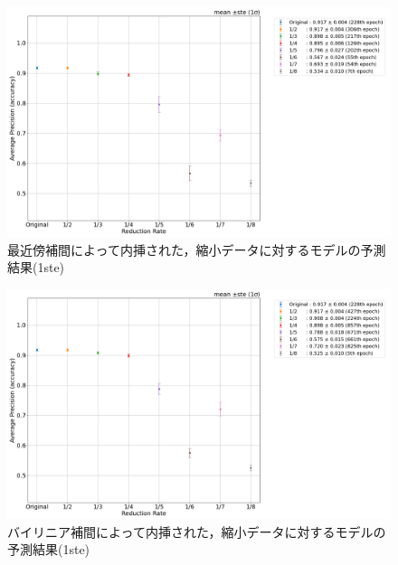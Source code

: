 \documentclass[a4j, 11pt]{jreport}
\begin{document}
\begin{figure}[H]
  \centering
  \includegraphics[width=16cm]{images/5syou/print_errorbar/nearest/acc_with_errorbar_syuron5_nearest_900epoch_30run_300_acc_max_ste1sigma.png}
  \caption{最近傍補間によって内挿された，縮小データに対するモデルの予測結果(1ste)}
  \label{fig:nearest_300_1ste}
\end{figure}

\begin{figure}[H]
  \centering
  \includegraphics[width=16cm]{images/5syou/print_errorbar/linear/acc_with_errorbar_syuron5_linear_900epoch_30run_300_acc_max_ste1sigma.png}
  \caption{バイリニア補間によって内挿された，縮小データに対するモデルの予測結果(1ste)}
  \label{fig:linear_300_1ste}
\end{figure}
 
\end{document}
